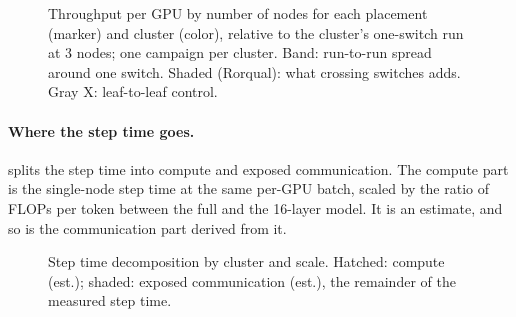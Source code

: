 \begin{figure}[h]
  \centering{}
  \caption{Throughput per GPU by number of nodes for each placement (marker) and cluster (color), relative to
    the cluster's one-switch run at 3 nodes; one campaign per cluster. Band: run-to-run spread around one
    switch. Shaded (Rorqual): what crossing switches adds. Gray X: leaf-to-leaf control.
    }
  \label{fig:placement-scaling}
\end{figure}


\paragraph{Where the step time goes.}  splits the step time into compute and exposed
communication. The compute part is the single-node step time at the same per-GPU batch, scaled by the
ratio of FLOPs per token between the full and the 16-layer model. It is an estimate, and so is the
communication part derived from it.

\begin{figure}[h]
  \centering{}
  \caption{Step time decomposition by cluster and scale. Hatched: compute (est.); shaded: exposed
    communication (est.), the remainder of the measured step time. }
  \label{fig:decomposition}
\end{figure}

